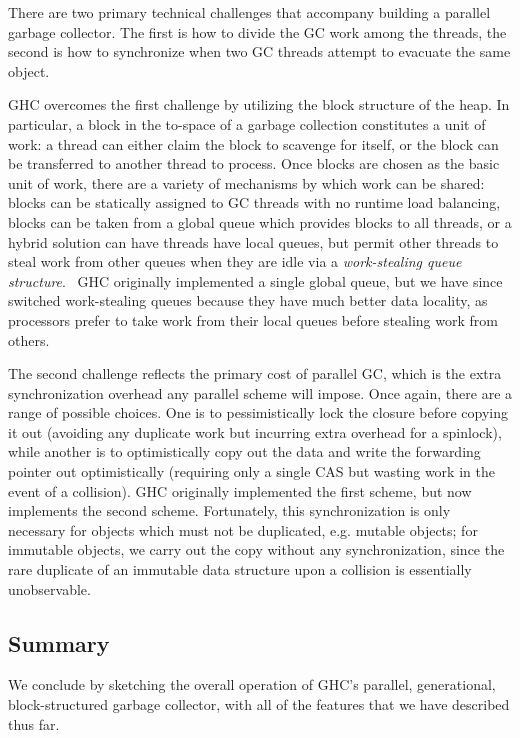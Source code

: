 There are two primary technical challenges that accompany building a
parallel garbage collector.  The first is how to divide the GC work
among the threads, the second is how to synchronize when two GC threads
attempt to evacuate the same object.

GHC overcomes the first challenge by utilizing the block structure of
the heap.  In particular, a block in the to-space of a garbage
collection constitutes a unit of work: a thread can either claim the
block to scavenge for itself, or the block can be transferred to another
thread to process.  Once blocks are chosen as the basic unit of
work, there are a variety of mechanisms by which work can be shared:
blocks can be statically assigned to GC threads with no runtime load
balancing, blocks can be taken from a global queue which provides blocks
to all threads, or a hybrid solution can have threads have local queues,
but permit other threads to steal work from other queues when they are
idle via a \emph{work-stealing queue structure}.~\XXX{}  GHC originally
implemented a single global queue, but we have since switched work-stealing queues
because they have much better data locality, as processors prefer to take
work from their local queues before stealing work from others.

The second challenge reflects the primary cost of parallel GC, which is
the extra synchronization overhead any parallel scheme will impose.
Once again, there are a range of possible choices.  One is to
pessimistically lock the closure before copying it out (avoiding any
duplicate work but incurring extra overhead for a spinlock), while
another is to optimistically copy out the data and write the forwarding
pointer out optimistically (requiring only a single CAS but wasting work
in the event of a collision).  GHC originally implemented the first
scheme, but now implements the second scheme.   Fortunately, this synchronization is only necessary for objects
which must not be duplicated, e.g. mutable objects; for immutable
objects, we carry out the copy without any synchronization, since the
rare duplicate of an immutable data structure upon a collision is
essentially unobservable.

\subsection{Summary}

We conclude by sketching the overall operation of GHC's parallel,
generational, block-structured garbage collector, with all of the
features that we have described thus far.

